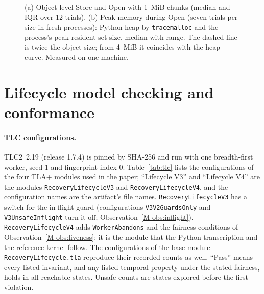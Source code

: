 \documentclass[pdflatex,sn-mathphys-num]{sn-jnl}
\newcommand{\code}[1]{\texttt{#1}}
\begin{document}
\begin{figure}[htbp]
\centering
\figbox{}
\caption{(a) Object-level Store and Open with 1~MiB chunks (median and IQR over 12 trials). (b) Peak memory during Open (seven trials per size in fresh processes): Python heap by \code{tracemalloc} and the process's peak resident set size, median with range. The dashed line is twice the object size; from 4~MiB it coincides with the heap curve. Measured on one machine.}\label{fig:objects}
\end{figure}

\section{Lifecycle model checking and conformance}\label{sec:s-formal}

\paragraph{TLC configurations.}
TLC2~2.19 (release 1.7.4) is pinned by SHA-256 and run with one breadth-first worker, seed 1 and fingerprint index 0. Table~\ref{tab:tlc} lists the configurations of the four TLA+ modules used in the paper; ``Lifecycle V3'' and ``Lifecycle V4'' are the modules \code{RecoveryLifecycleV3} and \code{RecoveryLifecycleV4}, and the configuration names are the artifact's file names. \code{RecoveryLifecycleV3} has a switch for the in-flight guard (configurations \code{V3V2GuardsOnly} and \code{V3UnsafeInflight} turn it off; Observation~\ref{M-obs:inflight}). \code{RecoveryLifecycleV4} adds \code{WorkerAbandons} and the fairness conditions of Observation~\ref{M-obs:liveness}; it is the module that the Python transcription and the reference kernel follow. The configurations of the base module \code{RecoveryLifecycle.tla} reproduce their recorded counts as well. ``Pass'' means every listed invariant, and any listed temporal property under the stated fairness, holds in all reachable states. Unsafe counts are states explored before the first violation.
\end{document}
